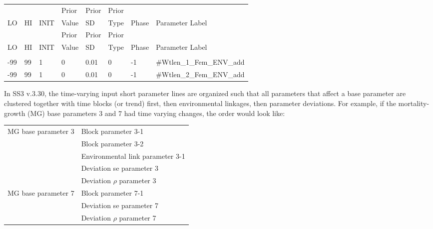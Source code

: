 \begin{longtable}{ p{0.7cm} p{0.7cm} p{0.7cm}  p{1cm}  p{1.4cm}  p{1cm} p{1cm} p{6.7cm}  }
	\hline
	&    &      & Prior &  Prior & Prior & & \Tstrut\\
	LO & HI & INIT & Value &  SD    & Type  & Phase & Parameter Label \Bstrut\\
	\hline
	\endfirsthead
	
	\hline
	&    &      & Prior &  Prior & Prior &  & \Tstrut\\
	LO & HI & INIT & Value &  SD    & Type  & Phase & Parameter Label \Bstrut\\
	\hline
	\endhead
	
	\endfoot
	
	\endlastfoot
	
	\multicolumn{7}{l}{COND: Only if MG parameters are time-varying} \Tstrut\\
	-99   & 99  & 1 & 0 & 0.01 & 0 & -1 &\#Wtlen\_1\_Fem\_ENV\_add\Tstrut\\
	-99   & 99  & 1 & 0 & 0.01 & 0 & -1 &\#Wtlen\_2\_Fem\_ENV\_add\Bstrut\\
	\hline
\end{longtable}

In SS3 v.3.30, the time-varying input short parameter lines are organized such that all parameters that affect a base parameter are clustered together with time blocks (or trend) first, then environmental linkages, then parameter deviations. For example, if the mortality-growth (MG) base parameters 3 and 7 had time varying changes, the order would look like:
 
 \begin{center}
 	\begin{longtable}{p{5cm} p{10cm}}
 		\hline
 		MG base parameter 3 & Block parameter 3-1\Tstrut\\
 		& Block parameter 3-2\\
 		& Environmental link parameter 3-1\\
 		& Deviation se parameter 3 \\
 		& Deviation $\rho$ parameter 3 \Bstrut\\
 		MG base parameter 7 & Block parameter 7-1 \\
 		& Deviation se parameter 7 \\
 		& Deviation $\rho$ parameter 7 \Bstrut\\
 		\hline	 	                    		
 	\end{longtable}
 \end{center}
 
